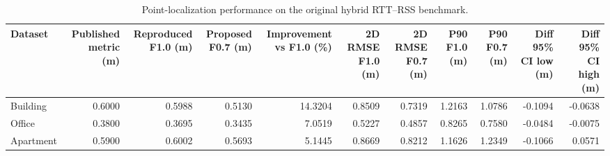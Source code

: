 \begin{table}
\caption{Point-localization performance on the original hybrid RTT--RSS benchmark.}
\label{tab:original_accuracy}
\begin{tabular}{lrrrrrrrrrr}
\toprule
Dataset & Published metric (m) & Reproduced F1.0 (m) & Proposed F0.7 (m) & Improvement vs F1.0 (\%) & 2D RMSE F1.0 (m) & 2D RMSE F0.7 (m) & P90 F1.0 (m) & P90 F0.7 (m) & Diff 95\% CI low (m) & Diff 95\% CI high (m) \\
\midrule
Building & 0.6000 & 0.5988 & 0.5130 & 14.3204 & 0.8509 & 0.7319 & 1.2163 & 1.0786 & -0.1094 & -0.0638 \\
Office & 0.3800 & 0.3695 & 0.3435 & 7.0519 & 0.5227 & 0.4857 & 0.8265 & 0.7580 & -0.0484 & -0.0075 \\
Apartment & 0.5900 & 0.6002 & 0.5693 & 5.1445 & 0.8669 & 0.8212 & 1.1626 & 1.2349 & -0.1066 & 0.0571 \\
\bottomrule
\end{tabular}
\end{table}
